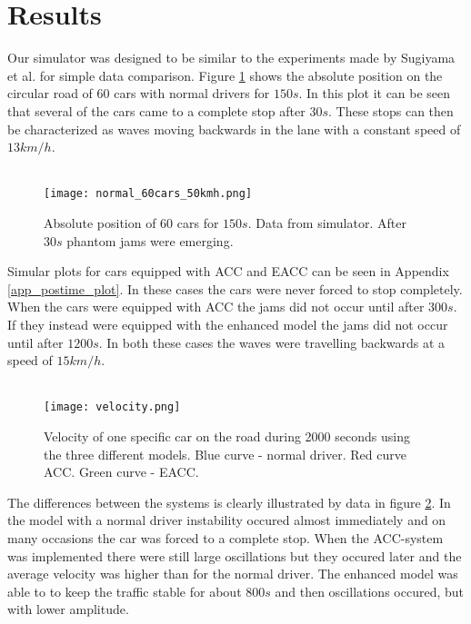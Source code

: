 \section{Results}
Our simulator was designed to be similar to the experiments made by Sugiyama
et al.\cite{sugiyama} for simple data comparison. Figure \ref{normal_postime}
shows the absolute position on the circular road of 60 cars with
normal drivers for $ 150 \unit{s} $. In this plot it can be seen that several
of the cars came to a complete stop after $ 30 \unit{s} $. These stops can
then be characterized as waves \cite{mit} moving backwards in the
lane with a constant speed of $ 13 \unit{km/h} $.\\\\

\begin{figure}[H]
    \begin{center}
    \texttt{[image: normal\_60cars\_50kmh.png]}
    \caption{\label{normal_postime}
Absolute position of 60 cars for $ 150 \unit{s} $. Data from simulator. After
$ 30 \unit{s} $ phantom jams were emerging.}
    \end{center}
\end{figure}

Simular plots for cars equipped with ACC and EACC can be seen in
Appendix \ref{app_postime_plot}. In these cases the cars were never forced to
stop completely. When the cars were equipped with ACC the jams did not occur
until after $ 300 \unit{s} $. If they instead were equipped with the enhanced
model the jams did not occur until after $ 1200 \unit{s} $. In both these
cases the waves were travelling backwards at a speed of $ 15 \unit{km/h} $.\\\\

\begin{figure}[h!]
    \begin{center}
    \texttt{[image: velocity.png]}
    \caption{\label{velocity}Velocity of one specific car on the road during
2000 seconds using the three different models. Blue curve - normal driver. Red
curve ACC. Green curve - EACC.}
    \end{center}
\end{figure}

The differences between the systems is clearly illustrated by data in figure
\ref{velocity}. In the model with a normal driver instability occured almost
immediately and on many occasions the car was forced to a complete stop. When
the ACC-system was implemented there were still large oscillations but
they occured later and the average velocity was higher than for the normal
driver. The enhanced model was able to to keep the traffic stable for about $
800 \unit{s} $ and then oscillations occured, but with lower amplitude.


